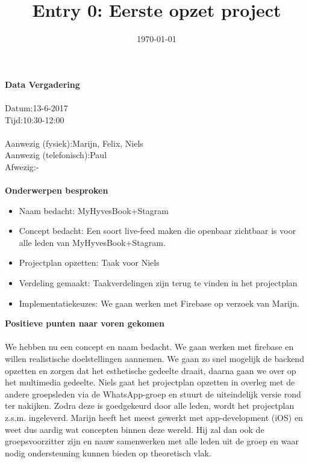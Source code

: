 \documentclass{uva-inf-article}
\title{Entry 0: Eerste opzet project}
\date{\today}
\newcommand\tab[1][1cm]{\hspace*{#1}}
\newcommand\tabb[1][1.4cm]{\hspace*{#1}}
\begin{document}
\maketitle

\noindent
\textbf{Data Vergadering}\\\\
Datum:\tab 13-6-2017
\\
Tijd:\tabb 10:30-12:00
\\\\
\noindent
Aanwezig (fysiek):\tabb\space\space\space Marijn, Felix, Niels\\
Aanwezig (telefonisch):\tab	Paul\\
Afwezig:\tabb\tabb\space\space\space\space-\\\\
\noindent
\textbf{Onderwerpen besproken}

\begin{itemize}
\item Naam bedacht:		MyHyvesBook+Stagram
\item Concept bedacht:		Een soort live-feed maken die openbaar zichtbaar is voor alle leden van MyHyvesBook+Stagram.
\item Projectplan opzetten: 	Taak voor Niels
\item Verdeling gemaakt:		Taakverdelingen zijn terug te vinden in het projectplan
\item Implementatiekeuzes:	We gaan werken met Firebase op verzoek van Marijn. 
\end{itemize}
\pagebreak

\noindent
\textbf{Positieve punten naar voren gekomen}\\\\
We hebben nu een concept en naam bedacht. We gaan werken met firebase en willen realistische doelstellingen aannemen. We gaan zo snel mogelijk de backend opzetten en zorgen dat het esthetische gedeelte draait, daarna gaan we over op het multimedia gedeelte.
Niels gaat het projectplan opzetten in overleg met de andere groepsleden via de WhatsApp-groep en stuurt de uiteindelijk versie rond ter nakijken. Zodra deze is goedgekeurd door alle leden, wordt het projectplan z.s.m. ingeleverd.
Marijn heeft het meest gewerkt met app-development (iOS) en weet dus aardig wat concepten binnen deze wereld. Hij zal dan ook de groepsvoorzitter zijn en nauw samenwerken met alle leden uit de groep en waar nodig ondersteuning kunnen bieden op theoretisch vlak.
\\\\
\end{document}
